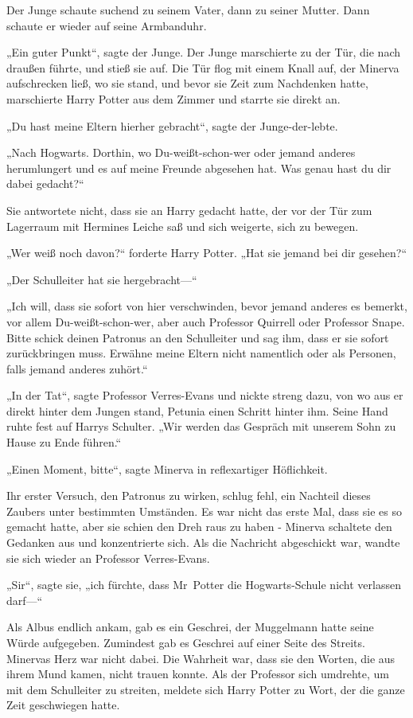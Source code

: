 {Der Junge schaute suchend zu seinem Vater, dann zu seiner Mutter. Dann schaute er wieder auf seine Armbanduhr.

„Ein guter Punkt“, sagte der Junge. Der Junge marschierte zu der Tür, die nach draußen führte, und stieß sie auf. Die Tür flog mit einem Knall auf, der Minerva aufschrecken ließ, wo sie stand, und bevor sie Zeit zum Nachdenken hatte, marschierte Harry Potter aus dem Zimmer und starrte sie direkt an.

„Du hast meine Eltern hierher gebracht“, sagte der Junge-der-lebte.

„Nach Hogwarts. Dorthin, wo Du-weißt-schon-wer oder jemand anderes herumlungert und es auf meine Freunde abgesehen hat. Was genau hast du dir dabei gedacht?“

Sie antwortete nicht, dass sie an Harry gedacht hatte, der vor der Tür zum Lagerraum mit Hermines Leiche saß und sich weigerte, sich zu bewegen.

„Wer weiß noch davon?“ forderte Harry Potter. „Hat sie jemand bei dir gesehen?“

„Der Schulleiter hat sie hergebracht—“

„Ich will, dass sie sofort von hier verschwinden, bevor jemand anderes es bemerkt, vor allem Du-weißt-schon-wer, aber auch Professor Quirrell oder Professor Snape. Bitte schick deinen Patronus an den Schulleiter und sag ihm, dass er sie sofort zurückbringen muss. Erwähne meine Eltern nicht namentlich oder als Personen, falls jemand anderes zuhört.“

„In der Tat“, sagte Professor Verres-Evans und nickte streng dazu, von wo aus er direkt hinter dem Jungen stand, Petunia einen Schritt hinter ihm. Seine Hand ruhte fest auf Harrys Schulter. „Wir werden das Gespräch mit unserem Sohn zu Hause zu Ende führen.“

„Einen Moment, bitte“, sagte Minerva in reflexartiger Höflichkeit.

Ihr erster Versuch, den Patronus zu wirken, schlug fehl, ein Nachteil dieses Zaubers unter bestimmten Umständen. Es war nicht das erste Mal, dass sie es so gemacht hatte, aber sie schien den Dreh raus zu haben - Minerva schaltete den Gedanken aus und konzentrierte sich. Als die Nachricht abgeschickt war, wandte sie sich wieder an Professor Verres-Evans.

„Sir“, sagte sie, „ich fürchte, dass Mr~Potter die Hogwarts-Schule nicht verlassen darf—“

Als Albus endlich ankam, gab es ein Geschrei, der Muggelmann hatte seine Würde aufgegeben. Zumindest gab es Geschrei auf einer Seite des Streits. Minervas Herz war nicht dabei. Die Wahrheit war, dass sie den Worten, die aus ihrem Mund kamen, nicht trauen konnte. Als der Professor sich umdrehte, um mit dem Schulleiter zu streiten, meldete sich Harry Potter zu Wort, der die ganze Zeit geschwiegen hatte.

}
